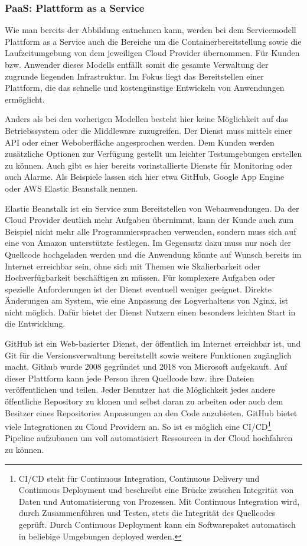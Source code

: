    \subsubsection{PaaS: Plattform as a Service}
   Wie man bereits der Abbildung entnehmen kann, werden bei dem Servicemodell Plattform as a Service auch die Bereiche um die
   Containerbereitstellung sowie die Laufzeitumgebung von dem jeweiligen Cloud Provider übernommen. Für Kunden bzw. Anwender dieses Modells
   entfällt somit die gesamte Verwaltung der zugrunde liegenden Infrastruktur. Im Fokus liegt das Bereitstellen einer Plattform, die das
   schnelle und kostengünstige Entwickeln von Anwendungen ermöglicht.


   Anders als bei den vorherigen Modellen besteht hier keine Möglichkeit auf das Betriebssystem oder die Middleware zuzugreifen.
   Der Dienst muss mittels einer API oder einer Weboberfläche angesprochen werden.
   Dem Kunden werden zusätzliche Optionen zur Verfügung gestellt um leichter Testumgebungen erstellen zu können.
   Auch gibt es hier bereits vorinstallierte Dienste für Monitoring oder auch Alarme.
   Als Beispiele lassen sich hier etwa GitHub, Google App Engine oder AWS Elastic Beanstalk nennen.


   Elastic Beanstalk ist ein Service zum Bereitstellen von Webanwendungen. Da der Cloud Provider deutlich mehr Aufgaben übernimmt, kann der Kunde
   auch zum Beispiel nicht mehr alle Programmiersprachen verwenden, sondern muss sich auf eine von Amazon unterstützte festlegen.
   Im Gegensatz dazu muss nur noch der Quellcode hochgeladen werden und die Anwendung könnte auf Wunsch bereits im Internet erreichbar sein, ohne sich mit Themen
   wie Skalierbarkeit oder Hochverfügbarkeit beschäftigen zu müssen. Für komplexere Aufgaben oder spezielle Anforderungen ist der Dienst eventuell weniger geeignet.
   Direkte Änderungen am System, wie eine Anpassung des Logverhaltens von Nginx, ist nicht möglich.
   Dafür bietet der Dienst Nutzern einen besonders leichten Start in die Entwicklung.

   GitHub ist ein Web-basierter Dienst, der öffentlich im Internet erreichbar ist, und Git für die Versionsverwaltung bereitstellt sowie weitere Funktionen zugänglich macht.
   Github wurde 2008 gegründet und 2018 von Microsoft aufgekauft. Auf dieser Plattform kann jede Person ihren Quellcode bzw. ihre Dateien veröffentlichen und teilen.
   Jeder Benutzer hat die Möglichkeit jedes andere öffentliche Repository zu klonen und selbst daran zu arbeiten oder auch dem Besitzer eines Repositories
   Anpassungen an den Code anzubieten. GitHub bietet viele Integrationen zu Cloud Providern an. So ist es möglich eine CI/CD\footnote{CI/CD steht für
   Continuous Integration, Continuous Delivery und Continuous Deployment und beschreibt eine Brücke zwischen Integrität von Daten und Automatisierung von Prozessen.
   Mit Continuous Integration wird, durch Zusammenführen und Testen, stets die Integrität des Quellcodes geprüft.
   Durch Continuous Deployment kann ein Softwarepaket automatisch in beliebige Umgebungen deployed werden. } Pipeline aufzubauen um voll automatisiert Ressourcen in der Cloud hochfahren zu können. \cite{GitHub}


